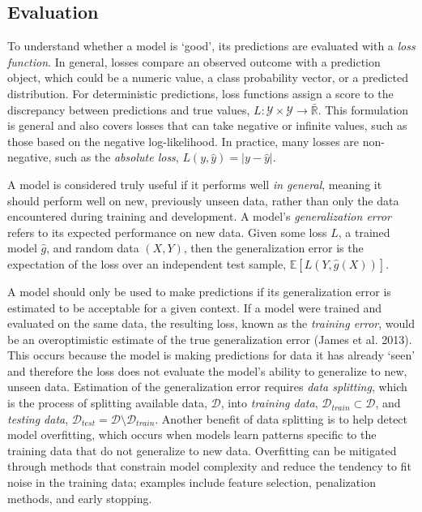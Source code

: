 \documentclass[
  letterpaper,
  krantz2]{style/krantz}
\begin{document}
\subsection{Evaluation}\label{sec-ml-evaluation}

To understand whether a model is `good', its predictions are evaluated
with a \emph{loss
function}. In general,
losses compare an observed outcome with a prediction object, which could
be a numeric value, a class probability vector, or a predicted
distribution. For deterministic predictions, loss functions assign a
score to the discrepancy between predictions and true values,
\(L: \mathcal{Y}\times \mathcal{Y}\rightarrow \bar{\mathbb{R}}\). This
formulation is general and also covers losses that can take negative or
infinite values, such as those based on the negative log-likelihood. In
practice, many losses are non-negative, such as the \emph{absolute
loss},
\(L(y, \hat{y}) = \vert y - \hat{y} \vert\).

A model is considered truly useful if it performs well \emph{in
general}, meaning it should perform well on new, previously unseen data,
rather than only the data encountered during training and development. A
model's \emph{generalization error} refers
to its expected performance on new data. Given some loss \(L\), a
trained model \(\hat{g}\), and random data \((X, Y)\), then the
generalization error is the expectation of the loss over an independent
test sample, \(\mathbb{E}[L(Y, \hat{g}(X))]\).

A model should only be used to make predictions if its generalization
error is estimated to be acceptable for a given context. If a model were
trained and evaluated on the same data, the resulting loss, known as the
\emph{training error}, would be an overoptimistic
estimate of the true generalization error (James et al. 2013). This
occurs because the model is making predictions for data it has already
`seen' and therefore the loss does not evaluate the model's ability to
generalize to new, unseen data. Estimation of the generalization error
requires \emph{data splitting}, which is the
process of splitting available data, \(\mathcal{D}\), into
\emph{training data},
\(\mathcal{D}_{train}\subset \mathcal{D}\), and \emph{testing
data},
\(\mathcal{D}_{test}= \mathcal{D}\setminus \mathcal{D}_{train}\).
Another benefit of data splitting is to help detect model
overfitting, which occurs when models learn patterns
specific to the training data that do not generalize to new data.
Overfitting can be mitigated through methods that constrain model
complexity and reduce the tendency to fit noise in the training data;
examples include feature selection,
penalization methods, and early
stopping.
\end{document}
